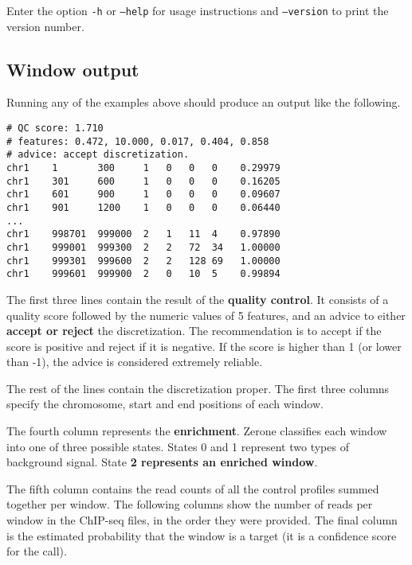 \documentclass[12pt]{article}
\begin{document}
Enter the option \texttt{-h} or \texttt{--help} for usage instructions and
\texttt{--version} to print the version number.

\subsection{Window output}

Running any of the examples above should produce an output like
the following.

\begin{verbatim}
# QC score: 1.710
# features: 0.472, 10.000, 0.017, 0.404, 0.858
# advice: accept discretization.
chr1    1       300     1   0   0   0    0.29979
chr1    301     600     1   0   0   0    0.16205
chr1    601     900     1   0   0   0    0.09607
chr1    901     1200    1   0   0   0    0.06440
...
chr1    998701  999000  2   1   11  4    0.97890
chr1    999001  999300  2   2   72  34   1.00000
chr1    999301  999600  2   2   128 69   1.00000
chr1    999601  999900  2   0   10  5    0.99894
\end{verbatim}

\begin{mdframed}
The first three lines contain the result of the \textbf{quality control}.
It consists of a quality score followed by the numeric values of 5
features, and an advice to either \textbf{accept or reject} the
discretization. The recommendation is to accept if the score is positive
and reject if it is negative. If the score is higher than 1 (or lower
than -1), the advice is considered extremely reliable.
\end{mdframed}

The rest of the lines contain the discretization proper. The first three columns
specify the chromosome, start and end positions of each window.

\begin{mdframed}
The fourth column represents the \textbf{enrichment}. Zerone classifies
each window into one of three possible states. States 0 and 1 represent two
types of background signal. State \textbf{2 represents an enriched window}.
\end{mdframed}

The fifth column contains the read counts of all the control profiles
summed together per window. The following columns show the number of
reads per window in the ChIP-seq files, in the order they were provided.
The final column is the estimated probability that the window is a
target (it is a confidence score for the call).
\end{document}
